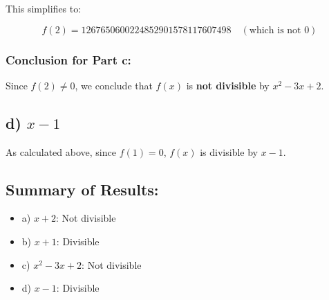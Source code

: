 \documentclass{article}
\begin{document}
This simplifies to:

\[
f(2) = 1267650600224852901578117607498 \quad (\text{which is not } 0)
\]

\subsubsection*{Conclusion for Part c:}

Since \( f(2) \neq 0 \), we conclude that \( f(x) \) is \textbf{not divisible} by \( x^2 - 3x + 2 \).

\subsection*{d) \( x - 1 \)}

As calculated above, since \( f(1) = 0 \), \( f(x) \) is divisible by \( x - 1 \).

\subsection*{Summary of Results:}
\begin{itemize}
    \item a) \( x + 2 \): Not divisible
    \item b) \( x + 1 \): Divisible
    \item c) \( x^2 - 3x + 2 \): Not divisible
    \item d) \( x - 1 \): Divisible
\end{itemize}
\end{document}
